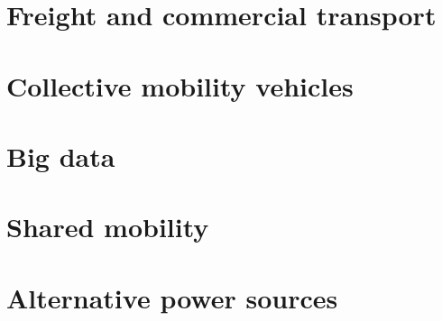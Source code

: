 \documentclass[
]{book}
\begin{document}
\hypertarget{freight-and-commercial-transport}{%
\chapter{Freight and commercial transport}\label{freight-and-commercial-transport}}

\hypertarget{collective-mobility-vehicles}{%
\chapter{Collective mobility vehicles}\label{collective-mobility-vehicles}}

\hypertarget{big-data}{%
\chapter{Big data}\label{big-data}}

\hypertarget{shared-mobility}{%
\chapter{Shared mobility}\label{shared-mobility}}

\hypertarget{alternative-power-sources}{%
\chapter{Alternative power sources}\label{alternative-power-sources}}

  
\end{document}
